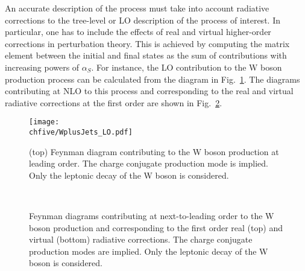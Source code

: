 An accurate description of the process must take into account radiative corrections to the tree-level or LO description of the process of interest.
In particular, one has to include the effects of real and virtual higher-order corrections in perturbation theory.
This is achieved by computing the matrix element between the initial and final states as the sum of contributions with increasing powers of $\alpha_S$.
For instance, the LO contribution to the W boson production process can be calculated from the diagram in Fig.~\ref{fig:wjetsFD_LO}.
The diagrams contributing at NLO to this process and corresponding to the real and virtual radiative corrections at the first order are shown in Fig.~\ref{fig:wjetsFD_NLO}.\\

\begin{figure}[!htb]
\centering
\texttt{[image: \\chfive/WplusJets\_LO.pdf]}
\caption{(top) Feynman diagram contributing to the W boson production at leading order. The charge conjugate production mode is implied. Only the leptonic decay of the W boson is considered.}
\label{fig:wjetsFD_LO}
\end{figure}

\begin{figure}[!htb]
\centering
{}
\\
\caption{Feynman diagrams contributing at next-to-leading order to the W boson production and corresponding to the first order real (top) and virtual (bottom) radiative corrections.
The charge conjugate production modes are implied. Only the leptonic decay of the W boson is considered.}
\label{fig:wjetsFD_NLO}
\end{figure}

